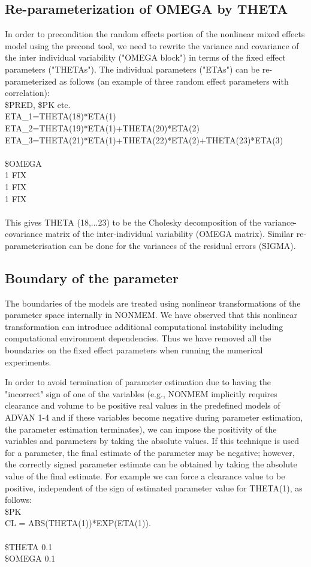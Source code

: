 \subsection{Re-parameterization of OMEGA by THETA} \label{app::repara}
In order to precondition the random effects portion of the nonlinear mixed effects model using the precond tool, we need to rewrite the variance and covariance of the inter individual variability ("OMEGA block") in terms of the fixed effect parameters ("THETAs"). The individual parameters ("ETAs") can be re-parameterized as follows (an example of three random effect parameters with correlation):\\
\$PRED, \$PK etc.\\
ETA\_1=THETA(18)*ETA(1)\\
ETA\_2=THETA(19)*ETA(1)+THETA(20)*ETA(2)\\
ETA\_3=THETA(21)*ETA(1)+THETA(22)*ETA(2)+THETA(23)*ETA(3)\\
\\
\$OMEGA\\  1  FIX\\
 1  FIX\\
 1  FIX\\
 \\
This gives THETA (18,...23) to be the Cholesky decomposition of the variance-covariance matrix of the inter-individual variability (OMEGA matrix). Similar re-parameterisation can be done for the variances of the residual errors (SIGMA).

\subsection{Boundary of the parameter} \label{app::abs}
The boundaries of the models are treated using nonlinear transformations of the parameter space internally in NONMEM.  We have observed that this nonlinear transformation can introduce additional computational instability including computational environment dependencies. Thus we have removed all the boundaries on the fixed effect parameters when running the numerical experiments.

In order to avoid  termination of  parameter estimation due to having the "incorrect" sign of one of the variables (e.g., NONMEM implicitly requires clearance and volume to be positive real values in the predefined models of ADVAN 1-4 and if these variables become negative during  parameter estimation, the parameter estimation terminates), we can impose the positivity of the variables and parameters by taking the absolute values. If this technique is used for a parameter, the final estimate of the parameter may be negative; however, the correctly signed parameter estimate can be obtained by taking the absolute value of the final estimate.  For example we can force a clearance value to be positive, independent of the sign of estimated parameter value for THETA(1), as follows:\\
\$PK\\
CL     = ABS(THETA(1))*EXP(ETA(1)).\\
\\
\$THETA 0.1\\
\$OMEGA 0.1\\


